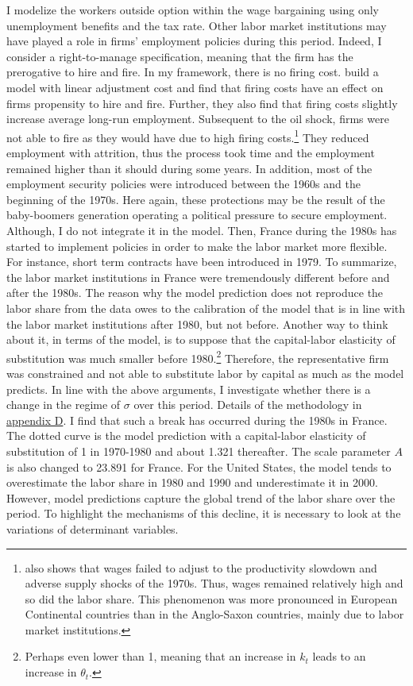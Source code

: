 I modelize the workers outside option within the wage bargaining using only unemployment benefits and the tax rate. Other labor market institutions may have played a role in firms' employment policies during this period. Indeed, I consider a right-to-manage specification, meaning that the firm has the prerogative to hire and fire. In my framework, there is no firing cost. \cite{Bentolila1990} build a model with linear adjustment cost and find that firing costs have an effect on firms propensity to hire and fire. Further, they also find that firing costs slightly increase average long-run employment. Subsequent to the oil shock, firms were not able to fire as they would have due to high firing costs.\footnote{\cite{Blanchard1997} also shows that wages failed to adjust to the productivity slowdown and adverse supply shocks of the 1970s. Thus, wages remained relatively high and so did the labor share. This phenomenon was more pronounced in European Continental countries than in the Anglo-Saxon countries, mainly due to labor market institutions.} They reduced employment with attrition, thus the process took time and the employment remained higher than it should during some years. In addition, most of the employment security policies were introduced between the 1960s and the beginning of the 1970s. Here again, these protections may be the result of the baby-boomers generation operating a political pressure to secure employment. Although, I do not integrate it in the model. Then, France during the 1980s has started to implement policies in order to make the labor market more flexible. For instance, short term contracts have been introduced in 1979. To summarize, the labor market institutions in France were tremendously different before and after the 1980s. The reason why the model prediction does not reproduce the labor share from the data owes to the calibration of the model that is in line with the labor market institutions after 1980, but not before. Another way to think about it, in terms of the model, is to suppose that the capital-labor elasticity of substitution was much smaller before 1980.\footnote{Perhaps even lower than 1, meaning that an increase in $k_t$ leads to an increase in $\theta_t$.} Therefore, the representative firm was constrained and not able to substitute labor by capital as much as the model predicts.
In line with the above arguments, I investigate whether there is a change in the regime of $\sigma$ over this period. Details of the methodology in \hyperref[appendix:regime]{appendix D}. I find that such a break has occurred during the 1980s in France. The dotted curve is the model prediction with a capital-labor elasticity of substitution of 1 in 1970-1980 and about 1.321 thereafter. The scale parameter $A$ is also changed to 23.891 for France.
For the United States, the model tends to overestimate the labor share in 1980 and 1990 and underestimate it in 2000.
However, model predictions capture the global trend of the labor share over the period.
To highlight the mechanisms of this decline, it is necessary to look at the variations of determinant variables.

